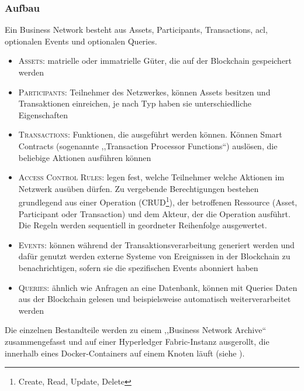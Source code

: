         \subsubsection*{Aufbau}
            Ein Business Network besteht aus Assets, Participants, Transactions, \gls{acl}, optionalen Events und optionalen Queries.
            \begin{itemize}
                \item \textsc{Assets}: matrielle oder immatrielle Güter, die auf der Blockchain gespeichert werden
                \item \textsc{Participants}: Teilnehmer des Netzwerkes, können Assets besitzen und Transaktionen einreichen, je nach Typ haben sie unterschiedliche Eigenschaften
                \item \textsc{Transactions}: Funktionen, die ausgeführt werden können. 
                    Können Smart Contracts (sogenannte ,,Transaction Processor Functions``) auslösen, die beliebige Aktionen ausführen können
                \item \textsc{Access Control Rules}: legen fest, welche Teilnehmer welche Aktionen im Netzwerk ausüben dürfen. 
                    Zu vergebende Berechtigungen bestehen grundlegend aus einer Operation (CRUD\!\footnote{Create, Read, Update, Delete}), der betroffenen Ressource (Asset, Participant oder Transaction) und dem Akteur, der die Operation ausführt.
                    Die Regeln werden sequentiell in geordneter Reihenfolge ausgewertet. 
                \item \textsc{Events}: können während der Transaktionsverarbeitung generiert werden und dafür genutzt werden externe Systeme von Ereignissen in der Blockchain zu benachrichtigen, sofern sie die spezifischen Events abonniert haben
                \item \textsc{Queries}: ähnlich wie Anfragen an eine Datenbank, können mit Queries Daten aus der Blockchain gelesen und beispielsweise automatisch weiterverarbeitet werden
            \end{itemize}
            Die einzelnen Bestandteile werden zu einem ,,Business Network Archive`` zusammengefasst und auf einer Hyperledger Fabric-Instanz ausgerollt, die innerhalb eines Docker-Containers auf einem Knoten läuft (siehe ).

